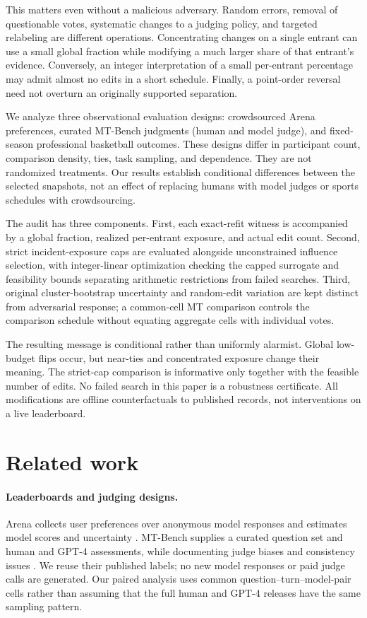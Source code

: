 \documentclass{article}
\begin{document}
This matters even without a malicious adversary. Random errors, removal of questionable votes, systematic changes to a judging policy, and targeted relabeling are different operations. Concentrating changes on a single entrant can use a small global fraction while modifying a much larger share of that entrant's evidence. Conversely, an integer interpretation of a small per-entrant percentage may admit almost no edits in a short schedule. Finally, a point-order reversal need not overturn an originally supported separation.

We analyze three observational evaluation designs: crowdsourced Arena preferences, curated MT-Bench judgments (human and model judge), and fixed-season professional basketball outcomes. These designs differ in participant count, comparison density, ties, task sampling, and dependence. They are not randomized treatments. Our results establish conditional differences between the selected snapshots, not an effect of replacing humans with model judges or sports schedules with crowdsourcing.

The audit has three components. First, each exact-refit witness is accompanied by a global fraction, realized per-entrant exposure, and actual edit count. Second, strict incident-exposure caps are evaluated alongside unconstrained influence selection, with integer-linear optimization checking the capped surrogate and feasibility bounds separating arithmetic restrictions from failed searches. Third, original cluster-bootstrap uncertainty and random-edit variation are kept distinct from adversarial response; a common-cell MT comparison controls the comparison schedule without equating aggregate cells with individual votes.

The resulting message is conditional rather than uniformly alarmist. Global low-budget flips occur, but near-ties and concentrated exposure change their meaning. The strict-cap comparison is informative only together with the feasible number of edits. No failed search in this paper is a robustness certificate. All modifications are offline counterfactuals to published records, not interventions on a live leaderboard.

\section{Related work}\label{sec:related}
\paragraph{Leaderboards and judging designs.}
Arena collects user preferences over anonymous model responses and estimates model scores and uncertainty \citep{chiang2024arena}. MT-Bench supplies a curated question set and human and GPT-4 assessments, while documenting judge biases and consistency issues \citep{zheng2023judging}. We reuse their published labels; no new model responses or paid judge calls are generated. Our paired analysis uses common question--turn--model-pair cells rather than assuming that the full human and GPT-4 releases have the same sampling pattern.
\end{document}
